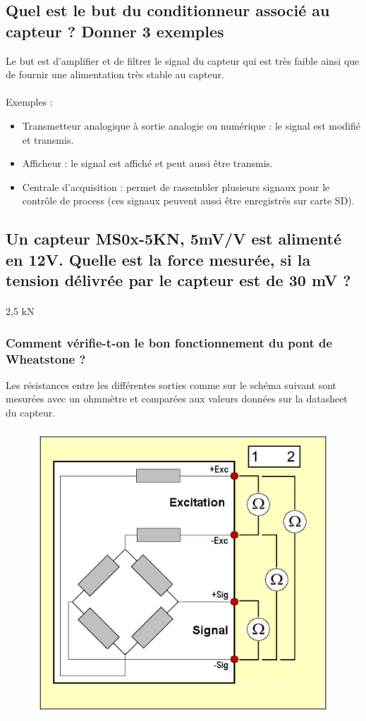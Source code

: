 \documentclass{article}
\begin{document}
\subsection{Quel est le but du conditionneur associé au capteur ? Donner 3 exemples}
Le but est d'amplifier et de filtrer le signal du capteur qui est très faible ainsi que de fournir une alimentation très stable au capteur.

\paragraph{}
Exemples :
\begin{itemize}
    \item Transmetteur analogique à sortie analogie ou numérique : le signal est modifié et transmis.
    \item Afficheur : le signal est affiché et peut aussi être transmis.
    \item Centrale d'acquisition : permet de rassembler plusieurs signaux pour le contrôle de process (ces signaux peuvent aussi être enregistrés sur carte SD).
\end{itemize}

\subsection{Un capteur MS0x-5KN, 5mV/V est alimenté en 12V. Quelle est la force mesurée, si la tension délivrée par le capteur est de 30 mV ?}
\paragraph{}
2,5 \si{\kilo\newton}

\subsubsection{Comment vérifie-t-on le bon fonctionnement du pont de Wheatstone ?}
Les résistances entre les différentes sorties comme sur le schéma suivant sont mesurées avec un ohmmètre et comparées aux valeurs données sur la datasheet du capteur.
\begin{figure}[H]
    \centering
    \includegraphics[width=0.4\linewidth]{./images/capteur-force-verif-wheatstone.png}
\end{figure}
\end{document}
